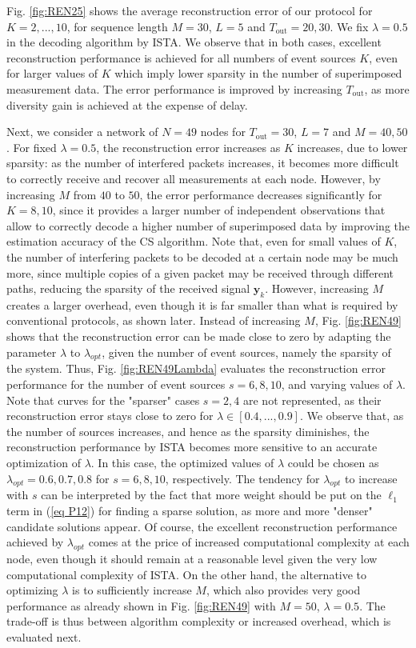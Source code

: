 \documentclass[letterpaper,conference]{IEEEtran}
\begin{document}
Fig. \ref{fig:REN25} shows the average reconstruction error of our protocol for $K =2,...,10$, for sequence length $M=30$, $L=5$ and $T_{\mathrm{out}}=20,30$. We fix $\lambda=0.5$ in the decoding algorithm by ISTA. We observe that in both cases, excellent reconstruction performance is achieved for all numbers of event sources $K$, even for larger values of $K$ which imply lower sparsity in the number of superimposed measurement data. The error performance is improved by increasing $T_{\mathrm{out}}$, as more diversity gain is achieved at the expense of delay.

Next, we consider a network of $N=49$ nodes for $T_{\mathrm{out}}=30$, $L=7$ and $M=40, 50$.
For fixed $\lambda=0.5$, the reconstruction error increases as $K$ increases, due to lower sparsity: as the number of interfered packets increases, it becomes more difficult to correctly receive and recover all measurements at each node. However, by increasing $M$ from $40$ to $50$, the error performance decreases significantly for $K=8, 10$, since it provides a larger number of independent observations that allow to correctly decode a higher number of superimposed data by improving the estimation accuracy of the CS algorithm. Note that, even for small values of $K$, the number of interfering packets to be decoded at a certain node may be much more, since multiple copies of a given packet may be received through different paths, reducing the sparsity of the received signal $\mathbf{y}_{k}$.
However, increasing $M$ creates a larger overhead, even though it is far smaller than what is required by conventional protocols, as shown later.
Instead of increasing $M$, Fig. \ref{fig:REN49} shows that the reconstruction error can be made close to zero by adapting the parameter $\lambda$ to $\lambda_{opt}$, given the number of event sources, namely the sparsity of the system. Thus,
Fig. \ref{fig:REN49Lambda} evaluates the reconstruction error performance for the number of event sources $s=6, 8, 10$, and varying values of $\lambda$. Note that curves for the "sparser" cases $s=2, 4$ are not represented, as their reconstruction error stays close to zero for $\lambda \in [0.4,...,0.9]$. We observe that, as the number of sources increases, and hence as the sparsity diminishes, the reconstruction performance by ISTA becomes more sensitive to an accurate optimization of $\lambda$. In this case, the optimized values of $\lambda$ could be chosen as $\lambda_{opt}=0.6, 0.7, 0.8$ for $s=6, 8, 10$, respectively. The tendency for $\lambda_{opt}$ to increase with $s$ can be interpreted by the fact that more weight should be put on the $\ell_1$ term in (\ref{eq P12}) for finding a sparse solution, as more and more "denser" candidate solutions appear.
Of course, the excellent reconstruction performance achieved by $\lambda_{opt}$ comes at the price of increased computational complexity at each node, even though it should remain at a reasonable level given the very low computational complexity of ISTA. On the other hand, the alternative to optimizing $\lambda$ is to sufficiently increase $M$, which also provides very good performance as already shown in Fig. \ref{fig:REN49} with $M=50$, $\lambda=0.5$. The trade-off is thus between algorithm complexity or increased overhead, which is evaluated next.
\end{document}
